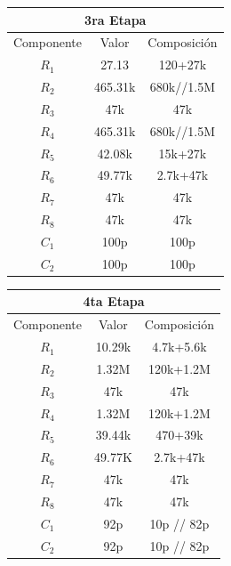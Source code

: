 \begin{table}[H]
\centering
\begin{tabular}{ccc}
\multicolumn{3}{c}{3ra Etapa}                                              \\ \hline
\multicolumn{1}{c|}{Componente} & \multicolumn{1}{c|}{Valor} & Composición \\ \hline
$R_1$                           & 27.13                      & 120+27k     \\
$R_2$                           & 465.31k                    & 680k//1.5M  \\
$R_3$                           & 47k                        & 47k         \\
$R_4$                           & 465.31k                    & 680k//1.5M  \\
$R_5$                           & 42.08k                     & 15k+27k     \\
$R_6$                           & 49.77k                     & 2.7k+47k    \\
$R_7$                           & 47k                        & 47k         \\
$R_8$                           & 47k                        & 47k         \\
$C_1$                           & 100p                       & 100p        \\
$C_2$                           & 100p                       & 100p       
\end{tabular}
\end{table}
\begin{table}[H]
\centering
\begin{tabular}{ccc}
\multicolumn{3}{c}{4ta Etapa}                                              \\ \hline
\multicolumn{1}{c|}{Componente} & \multicolumn{1}{c|}{Valor} & Composición \\ \hline
$R_1$                           & 10.29k                     & 4.7k+5.6k   \\
$R_2$                           & 1.32M                      & 120k+1.2M   \\
$R_3$                           & 47k                        & 47k         \\
$R_4$                           & 1.32M                      & 120k+1.2M   \\
$R_5$                           & 39.44k                     & 470+39k     \\
$R_6$                           & 49.77K                     & 2.7k+47k    \\
$R_7$                           & 47k                        & 47k         \\
$R_8$                           & 47k                        & 47k         \\
$C_1$                           & 92p                        & 10p // 82p  \\
$C_2$                           & 92p                        & 10p // 82p 
\end{tabular}
\end{table}
